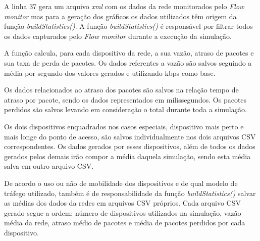 \documentclass[12pt]{article}
\begin{document}
A linha 37 gera um arquivo \textit{xml} com os dados da rede monitorados pelo \textit{Flow monitor} mas para a geração dos gráficos os dados utilizados têm origem da função \textit{buildStatistics()}. A função \textit{buildStatistics()} é responsável por filtrar todos os dados capturados pelo \textit{Flow monitor} durante a execução da simulação.

A função calcula, para cada dispositivo da rede, a sua vazão, atraso de pacotes e sua taxa de perda de pacotes. Os dados referentes a vazão são salvos seguindo a média por segundo dos valores gerados e utilizando kbps como base.

Os dados relacionados ao atraso dos pacotes são salvos na relação tempo de atraso por pacote, sendo os dados representados em milissegundos. Os pacotes perdidos são salvos levando em consideração o total durante toda a simulação.

Os dois dispositivos enquadrados nos casos especiais, dispositivo mais perto e mais longe do ponto de acesso, são salvos individualmente nos dois arquivos CSV correspondentes. Os dados gerados por esses dispositivos, além de todos os dados gerados pelos demais irão compor a média daquela simulação, sendo esta média salva em outro arquivo CSV.

De acordo o uso ou não de mobilidade dos dispositivos e de qual modelo de tráfego utilizado, também é de responsabilidade da função \textit{buildStatistics()} salvar as médias dos dados da redes em arquivos CSV próprios. Cada arquivo CSV gerado segue a ordem: número de dispositivos utilizados na simulação, vazão média da rede, atraso médio de pacotes e média de pacotes perdidos por cada dispositivo.
\end{document}
